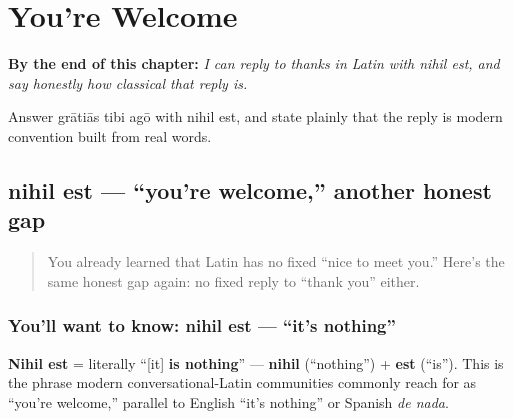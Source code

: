 
\chapter{You're Welcome}
\label{ch:la-youre-welcome}

\begin{chapteropening}
\textbf{By the end of this chapter:} \emph{I can reply to thanks in Latin with nihil est, and say honestly how classical that reply is.}

Answer grātiās tibi agō with nihil est, and state plainly that the reply is modern convention built from real words.
\end{chapteropening}

\section[nihil est]{nihil est — \textquotedblleft{}you're welcome,\textquotedblright{} another honest gap}

\label{lesson:LA-C23-nihil-est}



\begin{quote}
You already learned that Latin has no fixed \textquotedblleft{}nice to meet you.\textquotedblright{} Here's the same honest gap again: no fixed reply to \textquotedblleft{}thank you\textquotedblright{} either.
\end{quote}

\subsection*{You'll want to know: nihil est — \textquotedblleft{}it's nothing\textquotedblright{}}
\textbf{Nihil est} = literally \textquotedblleft{}{[}it{]} \textbf{is nothing}\textquotedblright{} — \textbf{nihil} (\textquotedblleft{}nothing\textquotedblright{}) + \textbf{est} (\textquotedblleft{}is\textquotedblright{}). This is the phrase modern conversational-Latin communities commonly reach for as \textquotedblleft{}you're welcome,\textquotedblright{} parallel to English \textquotedblleft{}it's nothing\textquotedblright{} or Spanish \emph{de nada}.


